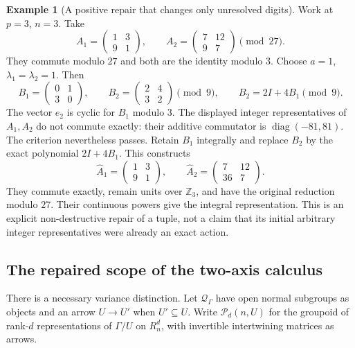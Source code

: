 \documentclass[11pt]{article}
\theoremstyle{definition}
\newtheorem{example}[theorem]{Example}
\theoremstyle{remark}
\begin{document}
\begin{example}[A positive repair that changes only unresolved digits]\label{ex:abelian-positive-repair}
Work at $p=3$, $n=3$. Take
\[
 A_1=\begin{pmatrix}1&3\\9&1\end{pmatrix},\qquad
 A_2=\begin{pmatrix}7&12\\9&7\end{pmatrix}\pmod{27}.
\]
They commute modulo $27$ and both are the identity modulo $3$. Choose $a=1$, $\lambda_1=\lambda_2=1$. Then
\[
 B_1=\begin{pmatrix}0&1\\3&0\end{pmatrix},\qquad
 B_2=\begin{pmatrix}2&4\\3&2\end{pmatrix}\pmod9,
 \qquad B_2=2I+4B_1\pmod9.
\]
The vector $e_2$ is cyclic for $B_1$ modulo $3$. The displayed integer representatives of $A_1,A_2$ do not commute exactly: their additive commutator is $\operatorname{diag}(-81,81)$. The criterion nevertheless passes. Retain $B_1$ integrally and replace $B_2$ by the exact polynomial $2I+4B_1$. This constructs
\[
 \widehat A_1=\begin{pmatrix}1&3\\9&1\end{pmatrix},\qquad
 \widehat A_2=\begin{pmatrix}7&12\\36&7\end{pmatrix}.
\]
They commute exactly, remain units over $\mathbb Z_3$, and have the original reduction modulo $27$. Their continuous powers give the integral representation. This is an explicit non-destructive repair of a tuple, not a claim that its initial arbitrary integer representatives were already an exact action.
\end{example}

\subsection{The repaired scope of the two-axis calculus}

There is a necessary variance distinction. Let $\mathcal Q_\Gamma$ have open normal subgroups as objects and an arrow $U\to U'$ when $U'\subseteq U$. Write $\mathscr P_d(n,U)$ for the groupoid of rank-$d$ representations of $\Gamma/U$ on $R_n^d$, with invertible intertwining matrices as arrows.
\end{document}

